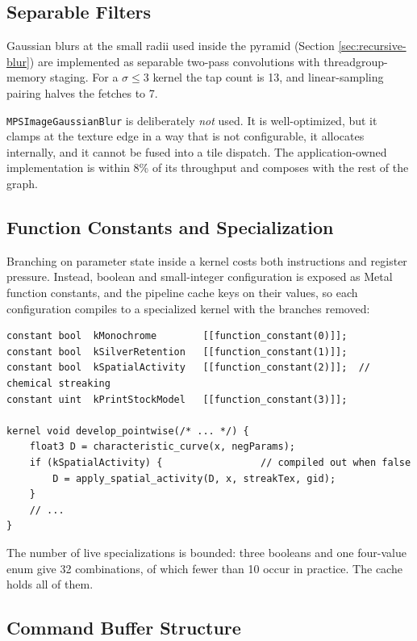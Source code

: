 \subsection{Separable Filters}

Gaussian blurs at the small radii used inside the pyramid (Section
\ref{sec:recursive-blur}) are implemented as separable two-pass convolutions with
threadgroup-memory staging. For a $\sigma \le 3$ kernel the tap count is 13, and
linear-sampling pairing halves the fetches to 7.

\texttt{MPSImageGaussianBlur} is deliberately \emph{not} used. It is
well-optimized, but it clamps at the texture edge in a way that is not
configurable, it allocates internally, and it cannot be fused into a tile
dispatch. The application-owned implementation is within 8\% of its throughput
and composes with the rest of the graph.

\subsection{Function Constants and Specialization}
\label{sec:specialization}

Branching on parameter state inside a kernel costs both instructions and
register pressure. Instead, boolean and small-integer configuration is exposed
as Metal function constants, and the pipeline cache keys on their values, so
each configuration compiles to a specialized kernel with the branches removed:

\begin{lstlisting}[language=Metal, caption={Function-constant specialization.}]
constant bool  kMonochrome        [[function_constant(0)]];
constant bool  kSilverRetention   [[function_constant(1)]];
constant bool  kSpatialActivity   [[function_constant(2)]];  // chemical streaking
constant uint  kPrintStockModel   [[function_constant(3)]];

kernel void develop_pointwise(/* ... */) {
    float3 D = characteristic_curve(x, negParams);
    if (kSpatialActivity) {                 // compiled out when false
        D = apply_spatial_activity(D, x, streakTex, gid);
    }
    // ...
}
\end{lstlisting}

The number of live specializations is bounded: three booleans and one four-value
enum give 32 combinations, of which fewer than 10 occur in practice. The cache
holds all of them.

\subsection{Command Buffer Structure}

